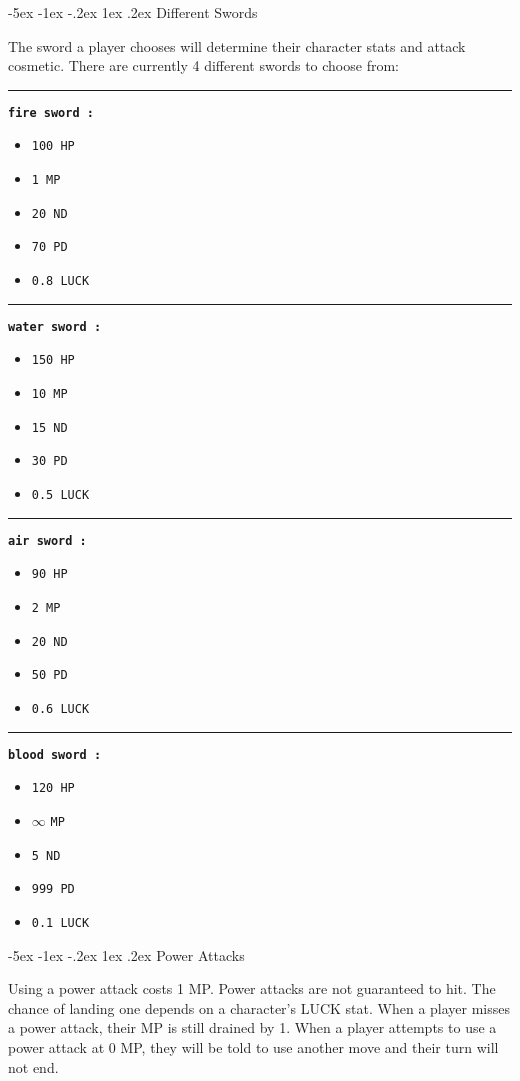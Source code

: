 \documentclass{article}
\makeatletter
\newenvironment{mypar}{%
    \setlength{\parskip}{1em}
    \parindent=0pt%
}{%
    \par%
}
\renewcommand\section{\@startsection {section}{1}{\z@}%
                                   {-5ex \@plus -1ex \@minus -.2ex}%
                                   {1ex \@plus .2ex}%
                                   {\normalfont\Large\bfseries}}
\newenvironment{swordinfo}[1]{%
    \vspace{0.3em}
    \rule{\linewidth}{0.1pt}%
    \vspace{0.5em}
    \par%
    \textbf{\texttt{#1 :}}%
    \begin{itemize}[label=-, labelsep=0.5em, font=\ttfamily]%
}{%
    \end{itemize}%
}
\makeatother
\begin{document}
\section{Different Swords}
\begin{mypar}
The sword a player chooses will determine their character stats and attack cosmetic. There are currently 4 different swords to choose from:
\end{mypar}

\begin{swordinfo}{fire sword}
\item \verb|100 HP|
\item \verb|1 MP|
\item \verb|20 ND|
\item \verb|70 PD|
\item \verb|0.8 LUCK|
\end{swordinfo}

\begin{swordinfo}{water sword}
\item \verb|150 HP|
\item \verb|10 MP|
\item \verb|15 ND|
\item \verb|30 PD|
\item \verb|0.5 LUCK|
\end{swordinfo}

\begin{swordinfo}{air sword}
\item \verb|90 HP|
\item \verb|2 MP|
\item \verb|20 ND|
\item \verb|50 PD|
\item \verb|0.6 LUCK|
\end{swordinfo}

\begin{swordinfo}{blood sword}
\item \verb|120 HP|
\item \textbf{$\infty$} \verb|MP|
\item \verb|5 ND|
\item \verb|999 PD|
\item \verb|0.1 LUCK|
\end{swordinfo}

\section{Power Attacks}
\begin{mypar}
Using a power attack costs 1 MP. Power attacks are not guaranteed to hit. The chance of landing one depends on a character's LUCK stat. When a player misses a power attack, their MP is still drained by 1. When a player attempts to use a power attack at 0 MP, they will be told to use another move and their turn will not end.
\end{mypar}
\end{document}
